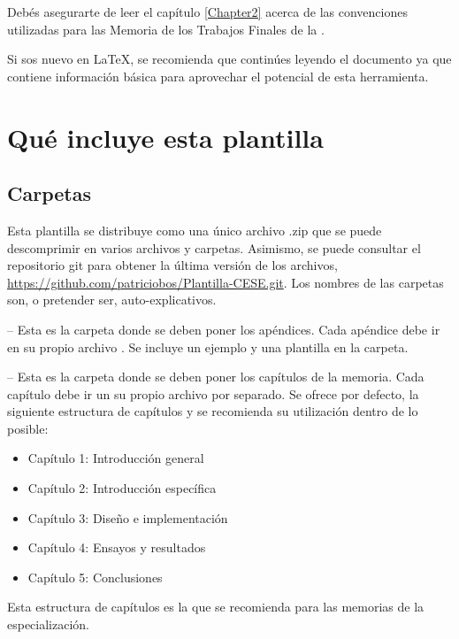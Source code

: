 Debés asegurarte de leer el capítulo \ref{Chapter2} acerca de las convenciones utilizadas para las Memoria de los Trabajos Finales de la \degreename.

Si sos nuevo en \LaTeX{}, se recomienda que continúes leyendo el documento ya que contiene información básica para aprovechar el potencial de esta herramienta.



\section{Qué incluye esta plantilla}

\subsection{Carpetas}

Esta plantilla se distribuye como una único archivo .zip que se puede descomprimir en varios archivos y carpetas. Asimismo, se puede consultar el repositorio git para obtener la última versión de los archivos, \url{https://github.com/patriciobos/Plantilla-CESE.git}. Los nombres de las carpetas son, o pretender ser, auto-explicativos.

 -- Esta es la carpeta donde se deben poner los apéndices. Cada apéndice debe ir en su propio archivo . Se incluye un ejemplo y una plantilla en la carpeta.

 -- Esta es la carpeta donde se deben poner los capítulos de la memoria. Cada capítulo debe ir un su propio archivo  por separado.  Se ofrece por defecto, la siguiente estructura de capítulos y se recomienda su utilización dentro de lo posible:

\begin{itemize}
\item Capítulo 1: Introducción general	
\item Capítulo 2: Introducción específica
\item Capítulo 3: Diseño e implementación
\item Capítulo 4: Ensayos y resultados
\item Capítulo 5: Conclusiones

\end{itemize}

Esta estructura de capítulos es la que se recomienda para las memorias de la especialización.

